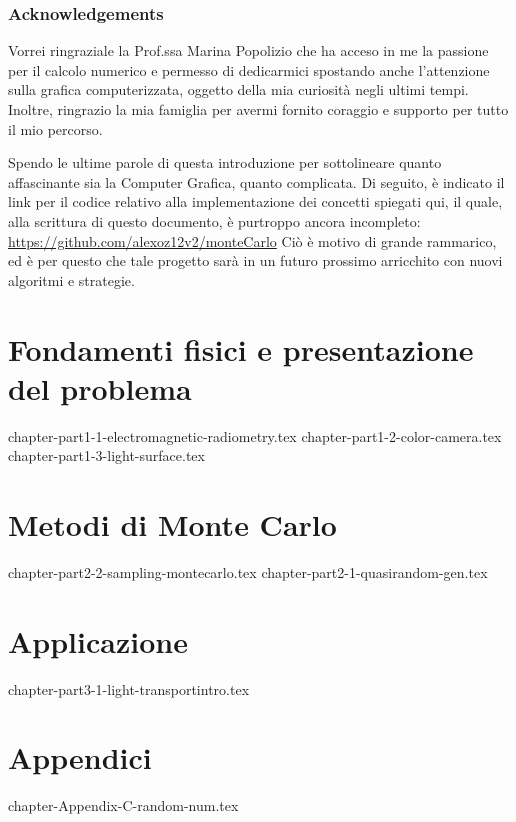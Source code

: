 \documentclass[12pt, openany]{book}
\theoremstyle{theoremdd}
\begin{document}
	\section*{Acknowledgements}
	Vorrei ringraziale la Prof.ssa Marina Popolizio che ha acceso in me la passione per il calcolo numerico e permesso di dedicarmici spostando anche 
	l'attenzione sulla grafica computerizzata, oggetto della mia curiosit\`a negli ultimi tempi. Inoltre, ringrazio la mia famiglia per avermi fornito
	coraggio e supporto per tutto il mio percorso.\par
	Spendo le ultime parole di questa introduzione per sottolineare quanto affascinante sia la Computer Grafica, quanto complicata. Di seguito, \`e 
	indicato il link per il codice relativo alla implementazione dei concetti spiegati qui, il quale, alla scrittura di questo documento, \`e 
	purtroppo ancora incompleto: \href{https://github.com/alexoz12v2/monteCarlo}{https://github.com/alexoz12v2/monteCarlo}
	Ci\`o \`e motivo di grande rammarico, ed \`e per questo che tale progetto sar\`a in un futuro prossimo arricchito con nuovi algoritmi e strategie.

	\tableofcontents

	\mainmatter
	\part{Fondamenti fisici e presentazione del problema}
	{chapter-part1-1-electromagnetic-radiometry.tex}
	{chapter-part1-2-color-camera.tex}
	{chapter-part1-3-light-surface.tex}

	\part{Metodi di Monte Carlo}
	{chapter-part2-2-sampling-montecarlo.tex}
	{chapter-part2-1-quasirandom-gen.tex}

	\part{Applicazione}
	{chapter-part3-1-light-transportintro.tex}

	\part{Appendici}
	\appendix
	{chapter-Appendix-C-random-num.tex}

	\backmatter
	\printbibliography

	\printglossaries
\end{document}
